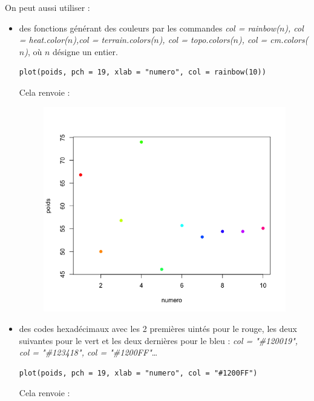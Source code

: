 On peut aussi utiliser :
\begin{itemize}
\item des fonctions générant des couleurs par les commandes \textit{col = rainbow($n$), col = heat.color($n$),col = terrain.colors($n$), col = topo.colors($n$), col = cm.colors($n$)}, où $n$ désigne un entier.
\begin{lstlisting}[language=html]
plot(poids, pch = 19, xlab = "numero", col = rainbow(10))
\end{lstlisting}
Cela renvoie :
\begin{figure}[H]\begin{center}\includegraphics[scale=0.4]{ilu/gra18.png}\end{center}\end{figure}
\item des codes hexadécimaux avec les 2 premières uintés pour le rouge, les deux suivantes pour le vert et les deux dernières pour le bleu : \textit{col = "\#120019", col = "\#123418", col = "\#1200FF"}\dots
\begin{lstlisting}[language=html]
plot(poids, pch = 19, xlab = "numero", col = "#1200FF")
\end{lstlisting}
Cela renvoie :

\end{itemize}
